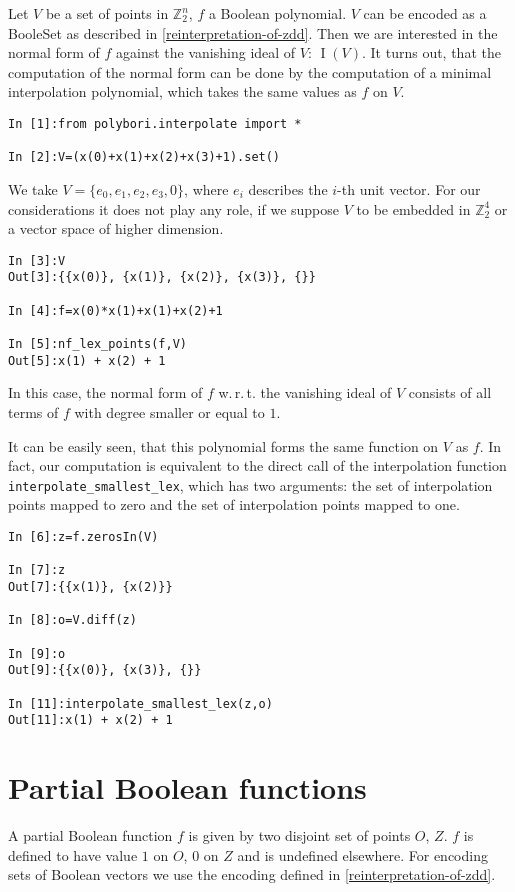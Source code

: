 \documentclass[]{article}
\DeclareMathOperator{\I}{I}
\newcommand{\Ztwo}{\mathbb{Z}_2}
\begin{document}
Let $V$ be a set of points in $\Ztwo^n$, $f$ a Boolean polynomial. $V$ can be encoded as a BooleSet as described in \ref{reinterpretation-of-zdd}.
Then we are interested in the normal form of $f$ against the vanishing ideal of $V$: $\I(V)$.
It turns out, that the computation of the normal form can be done by the computation of a minimal interpolation polynomial, which takes the same values as $f$ on $V$.

\begin{verbatim}
In [1]:from polybori.interpolate import *

In [2]:V=(x(0)+x(1)+x(2)+x(3)+1).set()
\end{verbatim}

We take $V=\{e_0,e_1,e_2,e_3,0\}$, where $e_i$ describes the $i$-th unit vector. For our considerations it does not play any role, if we suppose $V$ to be embedded in $\Ztwo^4$ or a vector space of higher dimension.

\begin{verbatim}
In [3]:V
Out[3]:{{x(0)}, {x(1)}, {x(2)}, {x(3)}, {}}

In [4]:f=x(0)*x(1)+x(1)+x(2)+1

In [5]:nf_lex_points(f,V)
Out[5]:x(1) + x(2) + 1
\end{verbatim}

In this case, the normal form of $f$ w.\,r.\,t. the vanishing ideal of $V$ consists of all terms of $f$ with degree smaller or equal to $1$.

It can be easily seen, that this polynomial forms the same function on $V$ as $f$.
In fact, our computation is equivalent to the direct call of the interpolation function \verb|interpolate_smallest_lex|, which has two arguments: the set of interpolation points mapped to zero and the set of interpolation points mapped to one.

\begin{verbatim}
In [6]:z=f.zerosIn(V)

In [7]:z
Out[7]:{{x(1)}, {x(2)}}

In [8]:o=V.diff(z)

In [9]:o
Out[9]:{{x(0)}, {x(3)}, {}}

In [11]:interpolate_smallest_lex(z,o)
Out[11]:x(1) + x(2) + 1
\end{verbatim}
\section{Partial Boolean functions}
A partial Boolean function $f$ is given by two disjoint set of points $O$, $Z$.
$f$ is defined to have value $1$ on $O$, $0$ on $Z$ and is undefined elsewhere.
For encoding sets of Boolean vectors we use the encoding defined in \ref{reinterpretation-of-zdd}.
\end{document}
